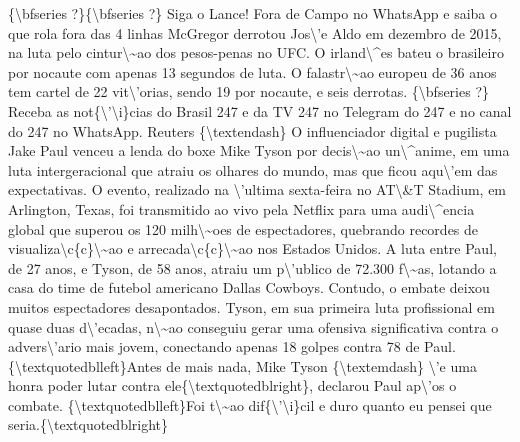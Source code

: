 \documentclass{article}%
\begin{document}
\newline%
\{\textbackslash{}bfseries ?\}\{\textbackslash{}bfseries ?\} Siga o Lance! Fora de Campo no WhatsApp e saiba o que rola fora das 4 linhas\newline%
\newline%
McGregor derrotou Jos\textbackslash{}'e Aldo em dezembro de 2015, na luta pelo cintur\textbackslash{}\textasciitilde{}ao dos pesos{-}penas no UFC. O irland\textbackslash{}\^{}es bateu o brasileiro por nocaute com apenas 13 segundos de luta. O falastr\textbackslash{}\textasciitilde{}ao europeu de 36 anos tem cartel de 22 vit\textbackslash{}'orias, sendo 19 por nocaute, e seis derrotas. \{\textbackslash{}bfseries ?\} Receba as not\{\textbackslash{}'\textbackslash{}i\}cias do Brasil 247 e da TV 247 no Telegram do 247 e no canal do 247 no WhatsApp.\newline%
\newline%
Reuters \{\textbackslash{}textendash\} O influenciador digital e pugilista Jake Paul venceu a lenda do boxe Mike Tyson por decis\textbackslash{}\textasciitilde{}ao un\textbackslash{}\^{}anime, em uma luta intergeracional que atraiu os olhares do mundo, mas que ficou aqu\textbackslash{}'em das expectativas. O evento, realizado na \textbackslash{}'ultima sexta{-}feira no AT\textbackslash{}\&T Stadium, em Arlington, Texas, foi transmitido ao vivo pela Netflix para uma audi\textbackslash{}\^{}encia global que superou os 120 milh\textbackslash{}\textasciitilde{}oes de espectadores, quebrando recordes de visualiza\textbackslash{}c\{c\}\textbackslash{}\textasciitilde{}ao e arrecada\textbackslash{}c\{c\}\textbackslash{}\textasciitilde{}ao nos Estados Unidos.\newline%
\newline%
A luta entre Paul, de 27 anos, e Tyson, de 58 anos, atraiu um p\textbackslash{}'ublico de 72.300 f\textbackslash{}\textasciitilde{}as, lotando a casa do time de futebol americano Dallas Cowboys. Contudo, o embate deixou muitos espectadores desapontados. Tyson, em sua primeira luta profissional em quase duas d\textbackslash{}'ecadas, n\textbackslash{}\textasciitilde{}ao conseguiu gerar uma ofensiva significativa contra o advers\textbackslash{}'ario mais jovem, conectando apenas 18 golpes contra 78 de Paul.\newline%
\newline%
\{\textbackslash{}textquotedblleft\}Antes de mais nada, Mike Tyson \{\textbackslash{}textemdash\} \textbackslash{}'e uma honra poder lutar contra ele\{\textbackslash{}textquotedblright\}, declarou Paul ap\textbackslash{}'os o combate. \{\textbackslash{}textquotedblleft\}Foi t\textbackslash{}\textasciitilde{}ao dif\{\textbackslash{}'\textbackslash{}i\}cil e duro quanto eu pensei que seria.\{\textbackslash{}textquotedblright\}\newline%
\end{document}
